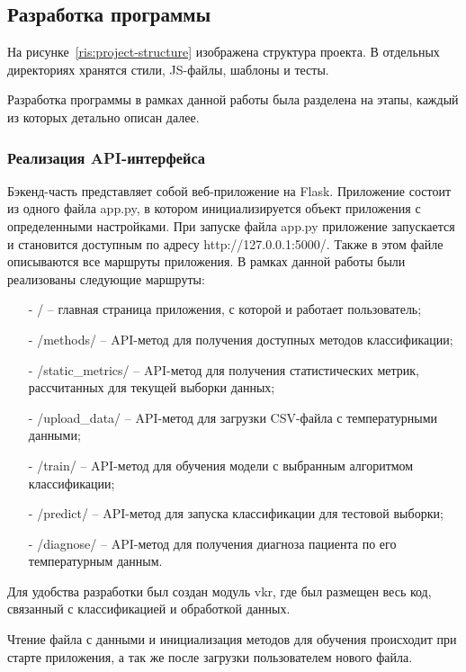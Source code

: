 \subsection{Разработка программы}
На рисунке~\ref{ris:project-structure} изображена структура проекта. В отдельных директориях хранятся стили, JS-файлы, шаблоны и тесты.
\par
Разработка программы в рамках данной работы была разделена на этапы, каждый из которых детально описан далее.

\subsubsection{Реализация API-интерфейса}
Бэкенд-часть представляет собой веб-приложение на Flask. Приложение состоит из одного файла app.py, в котором инициализируется объект приложения с определенными настройками. При запуске файла app.py приложение запускается и становится доступным по адресу http://127.0.0.1:5000/. Также в этом файле описываются все маршруты приложения. В рамках данной работы были реализованы следующие маршруты:
\begin{itemize}
	\item[-] / -- главная страница приложения, с которой и работает пользователь;
	\item[-] /methods/ -- API-метод для получения доступных методов классификации;
	\item[-] /static\_metrics/ -- API-метод для получения статистических метрик, рассчитанных для текущей выборки данных;
	\item[-] /upload\_data/ -- API-метод для загрузки CSV-файла с температурными данными;
	\item[-] /train/ -- API-метод для обучения модели с выбранным алгоритмом классификации;
	\item[-] /predict/ -- API-метод для запуска классификации для тестовой выборки;
	\item[-] /diagnose/ -- API-метод для получения диагноза пациента по его температурным данным.
\end{itemize}
\par
Для удобства разработки был создан модуль vkr, где был размещен весь код, связанный с классификацией и обработкой данных.
\par
Чтение файла с данными и инициализация методов для обучения происходит при старте приложения, а так же после загрузки пользователем нового файла.
\par
